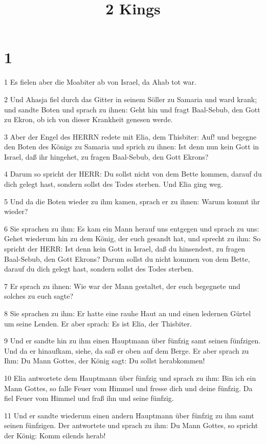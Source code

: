 

\title{2 Kings}


\chapter{1}

\par 1 Es fielen aber die Moabiter ab von Israel, da Ahab tot war.
\par 2 Und Ahasja fiel durch das Gitter in seinem Söller zu Samaria und ward krank; und sandte Boten und sprach zu ihnen: Geht hin und fragt Baal-Sebub, den Gott zu Ekron, ob ich von dieser Krankheit genesen werde.
\par 3 Aber der Engel des HERRN redete mit Elia, dem Thisbiter: Auf! und begegne den Boten des Königs zu Samaria und sprich zu ihnen: Ist denn nun kein Gott in Israel, daß ihr hingehet, zu fragen Baal-Sebub, den Gott Ekrons?
\par 4 Darum so spricht der HERR: Du sollst nicht von dem Bette kommen, darauf du dich gelegt hast, sondern sollst des Todes sterben. Und Elia ging weg.
\par 5 Und da die Boten wieder zu ihm kamen, sprach er zu ihnen: Warum kommt ihr wieder?
\par 6 Sie sprachen zu ihm: Es kam ein Mann herauf uns entgegen und sprach zu uns: Gehet wiederum hin zu dem König, der euch gesandt hat, und sprecht zu ihm: So spricht der HERR: Ist denn kein Gott in Israel, daß du hinsendest, zu fragen Baal-Sebub, den Gott Ekrons? Darum sollst du nicht kommen von dem Bette, darauf du dich gelegt hast, sondern sollst des Todes sterben.
\par 7 Er sprach zu ihnen: Wie war der Mann gestaltet, der euch begegnete und solches zu euch sagte?
\par 8 Sie sprachen zu ihm: Er hatte eine rauhe Haut an und einen ledernen Gürtel um seine Lenden. Er aber sprach: Es ist Elia, der Thisbiter.
\par 9 Und er sandte hin zu ihm einen Hauptmann über fünfzig samt seinen fünfzigen. Und da er hinaufkam, siehe, da saß er oben auf dem Berge. Er aber sprach zu Ihm: Du Mann Gottes, der König sagt: Du sollst herabkommen!
\par 10 Elia antwortete dem Hauptmann über fünfzig und sprach zu ihm: Bin ich ein Mann Gottes, so falle Feuer vom Himmel und fresse dich und deine fünfzig. Da fiel Feuer vom Himmel und fraß ihn und seine fünfzig.
\par 11 Und er sandte wiederum einen andern Hauptmann über fünfzig zu ihm samt seinen fünfzigen. Der antwortete und sprach zu ihm: Du Mann Gottes, so spricht der König: Komm eilends herab!

